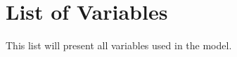 \documentclass[
	12pt, 
	]{article}
\begin{document}
\thispagestyle{empty}

\newpage


\section*{List of Variables}

This list will present all variables used in the model.



\thispagestyle{empty}

\newpage



\thispagestyle{empty}




\listoffigures

\thispagestyle{empty}

\newpage



\listoftables

\thispagestyle{empty}

\newpage

%
%
%
\end{document}

